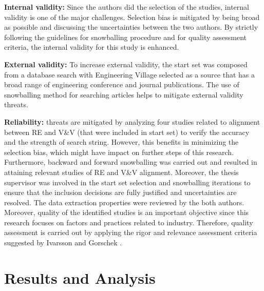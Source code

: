 \documentclass{article}
\begin{document}
\textbf{Internal validity:} Since the authors did the selection of the studies, internal validity is one of the major challenges. Selection bias is mitigated by being broad as possible and discussing the uncertainties between the two authors. By strictly following the guidelines for snowballing procedure and for quality assessment criteria, the internal validity for this study is enhanced. 

\textbf{External validity:} To increase external validity, the start set was composed from a database search with Engineering Village selected as a source that has a broad range of engineering conference and journal publications. The use of snowballing method for searching articles helps to mitigate external validity threats. 

\textbf{Reliability:} threats are mitigated by analyzing four studies related to alignment between RE and V\&V (that were included in start set) to verify the accuracy and the strength of search string. However, this benefits in minimizing the selection bias, which might have impact on further steps of this research.  Furthermore, backward and forward snowballing was carried out and resulted in attaining relevant studies of RE and V\&V alignment. Moreover, the thesis supervisor was involved in the start set selection and snowballing iterations to ensure that the inclusion decisions are fully justified and uncertainties are resolved.
The data extraction properties were reviewed by the both authors. Moreover, quality of the identified studies is an important objective since this research focuses on factors and practices related to industry. Therefore, quality assessment is carried out by applying the rigor and relevance assessment criteria suggested by Ivarsson and Gorschek \cite{ivarsson2011method}. 

\section{Results and Analysis}\label{ResultsAndAnalysis}

\end{document}
